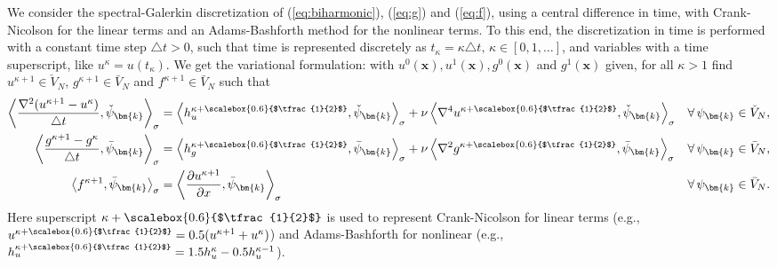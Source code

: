 \documentclass[preprint]{elsarticle}
\newcommand*{\Scale}[2][4]{\scalebox{#1}{$#2$}}%
\newcommand{\half}{\Scale[0.6]{\tfrac{1}{2}}}
\newcommand{\N}[1]{\check{#1}}
\newcommand{\D}[1]{\bar{#1}}
\begin{document}
We consider the spectral-Galerkin discretization of (\ref{eq:biharmonic}), (\ref{eq:g}) and (\ref{eq:f}), using a central difference in time, with Crank-Nicolson for the linear terms and an Adams-Bashforth method for the nonlinear terms. To this end, the discretization in time is performed with a constant time step $\triangle t>0$, 
such that time is represented discretely as $t_{\kappa} = {\kappa} \triangle t, \, {\kappa} \in [0, 1, \ldots]$, and variables with a time superscript, like $u^{\kappa} = u(t_{\kappa})$. We get the variational formulation: with $u^0(\bm{x}), u^1(\bm{x}), g^0(\bm{x})$ and $g^1(\bm{x})$ given, for all $\kappa > 1$ find ${u}^{\kappa+1} \in \N{V}_N$, ${g}^{\kappa+1} \in \D{V}_N$ and ${f}^{\kappa+1} \in \D{V}_N$ such that
\begin{align}
  \left<  \frac{\nabla^2(u^{\kappa+1}-u^{\kappa})}{\triangle t}, \N{\psi}_{\bm{k}}\right>_{\sigma} &= 
\left<h_u^{\kappa+\half}, \N{\psi}_{\bm{k}} \right>_{\sigma} + {\nu} \left<\nabla^4 u^{\kappa+\half}, \N{\psi}_{\bm{k}}\right>_{\sigma} 
&\forall \,\psi_{\bm{k}} \in \N{V}_N, \label{eq:u1} \\
  \left<\frac{g^{\kappa+1}- g^{\kappa}}{\triangle t}, \D{\psi}_{\bm{k}}\right>_{\sigma} &= \left<h_g^{\kappa + \half}, 
\D{\psi}_{\bm{k}}\right>_{\sigma} + {\nu} 
\left<\nabla^2 g^{\kappa+\half}, \D{\psi}_{\bm{k}}\right>_{\sigma} &\forall \, \psi_{\bm{k}} \in \D{V}_N ,
\label{eq:g1} \\
	\left<f^{\kappa+1}, \D{\psi}_{\bm{k}}\right>_{\sigma} &= \left<\frac{\partial u^{\kappa+1}}{\partial x}, 
	\D{\psi}_{\bm{k}}\right>_{\sigma} &\forall \, \psi_{\bm{k}} \in \D{V}_N. \label{eq:f1}
\end{align}
Here superscript $\kappa + \half$ is used to represent Crank-Nicolson for linear terms (e.g., $u^{\kappa+\half}=0.5(u^{\kappa+1}+u^{\kappa})$) and Adams-Bashforth for nonlinear (e.g., $h_u^{\kappa + \half} = 1.5h_u^{\kappa} - 0.5 h_u^{\kappa-1}$).
 
\end{document}
